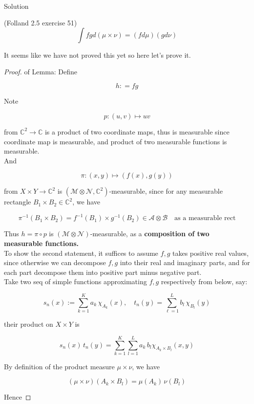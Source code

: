 \documentclass{qlnotes-export}
\begin{document}
\begin{qlsolution}{Solution}
\begin{lemma}{(Folland 2.5 exercise 51)}
\[\int fg d(\mu \times \nu) = (f d\mu)(g d\nu)\]

\end{lemma}

It seems like we have not proved this yet so here let's prove it.

\begin{proof}

of Lemma: Define

\[h: = fg\]

Note

\[p:(u,v)\mapsto uv\]

from \({\mathbb{C}}^{2}\rightarrow{\mathbb{C}}\) is a product of two coordinate maps, thus is measurable since coordinate map is measurable, and product of two measurable functions is measurable.\\
And

\[\pi:(x,y)\mapsto(f(x),g(y))\]

from \(X \times Y\rightarrow{\mathbb{C}}^{2}\) is \((\mathcal{M} \otimes \mathcal{N},{\mathbb{C}}^{2})\)-measurable, since for any measurable rectangle \(B_{1} \times B_{2} \in {\mathbb{C}}^{2}\), we have

\[\pi^{- 1}(B_{1} \times B_{2}) = f^{- 1}(B_{1}) \times g^{- 1}(B_{2}) \in \mathcal{A} \otimes \mathcal{B}\quad\text{as a measurable rect}\]

Thus \(h = \pi \circ p\) is \((\mathcal{M} \otimes \mathcal{N})\)-measurable, as a \textbf{composition of two measurable functions.}\\
To show the second statement, it suffices to assume \(f,g\) takes positive real values, since otherwise we can decompose \(f,g\) into their real and imaginary parts, and for each part decompose them into positive part minus negative part.\\
Take two seq of simple functions approximating \(f,g\) respectively from below, say:

\[s_{n}(x) := \sum\limits_{k = 1}^{K}a_{k}\,\chi_{A_{k}}(x),\quad t_{n}(y) = \sum\limits_{\ell = 1}^{L}b_{l}\,\chi_{B_{l}}(y)\]

their product on \(X \times Y\) is

\[s_{n}(x)\, t_{n}(y) = \sum\limits_{k = 1}^{K}\sum\limits_{l = 1}^{L}a_{k}\, b_{l}\chi_{A_{k} \times B_{l}}(x,y)\]

By definition of the product measure \(\mu \times \nu\), we have

\[(\mu \times \nu)(A_{k} \times B_{l}) = \mu(A_{k})\,\nu(B_{l})\]

Hence


\end{proof}
\end{qlsolution}
\end{document}

